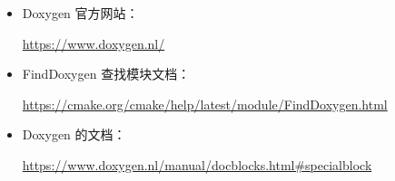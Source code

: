 

\begin{itemize}
\item
Doxygen 官方网站：

\url{https://www.doxygen.nl/}

\item
FindDoxygen 查找模块文档：

\url{https://cmake.org/cmake/help/latest/module/FindDoxygen.html}

\item
Doxygen 的文档：

\url{https://www.doxygen.nl/manual/docblocks.html#specialblock}
\end{itemize}